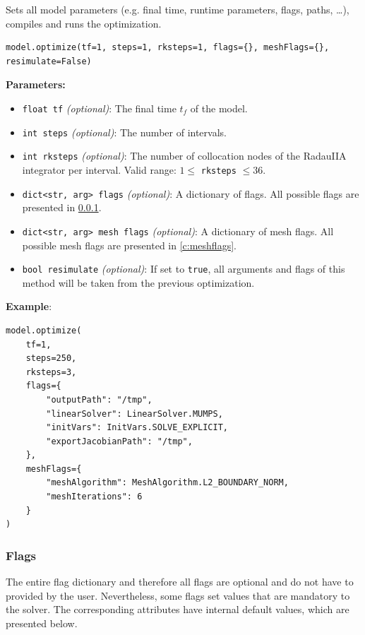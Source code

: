 \documentclass[12pt]{article}
\begin{document}
\begin{mdframed}[backgroundcolor=gray!10, roundcorner=10pt,
	linewidth=1pt]

	Sets all model parameters (e.g. final time, runtime parameters, flags, paths, \ldots), compiles and runs the optimization.
	
	\begin{lstlisting}
model.optimize(tf=1, steps=1, rksteps=1, flags={}, meshFlags={}, resimulate=False)
	\end{lstlisting}
	\label{optimize}
	\textbf{Parameters:}
	\begin{itemize}
		\item \texttt{float tf} \emph{(optional)}: The final time $t_f$ of the model.
		\item \texttt{int steps} \emph{(optional)}: The number of intervals.
		\item \texttt{int rksteps} \emph{(optional)}: The number of collocation nodes of the RadauIIA integrator per interval. Valid range: $1 \leq$ \texttt{rksteps} $\leq 36$.
		\item \texttt{dict<str, arg> flags} \emph{(optional)}: A dictionary of flags. All possible flags are presented in \ref{c:flags}.
		\item \texttt{dict<str, arg> mesh flags} \emph{(optional)}: A dictionary of mesh flags. All possible mesh flags are presented in \ref{c:meshflags}.
		\item \texttt{bool resimulate} \emph{(optional)}: If set to \texttt{true}, all arguments and flags of this method will be taken from the previous optimization.
	\end{itemize}
	
	\textbf{Example}:
	\begin{lstlisting}
model.optimize(
	tf=1,
	steps=250,
	rksteps=3,
	flags={
		"outputPath": "/tmp",
		"linearSolver": LinearSolver.MUMPS,
		"initVars": InitVars.SOLVE_EXPLICIT,
		"exportJacobianPath": "/tmp",
	},
	meshFlags={
		"meshAlgorithm": MeshAlgorithm.L2_BOUNDARY_NORM,
		"meshIterations": 6
	}
)
	\end{lstlisting}
	
\end{mdframed}

\subsubsection{Flags}
\label{c:flags}

The entire flag dictionary and therefore all flags are optional and do not have to provided by the user. Nevertheless, some flags set values that are mandatory to the solver. The corresponding attributes have internal default values, which are presented below.
\end{document}
